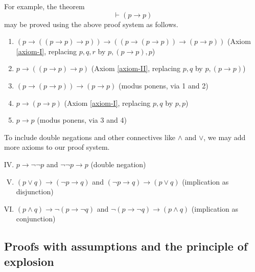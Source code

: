 For example, the theorem
%
\[\vdash (p \rightarrow p)\]
%
may be proved using the above proof system as follows.
%
\begin{enumerate}
    \item \((p \rightarrow ((p \rightarrow p) \rightarrow p)) \rightarrow ((p \rightarrow (p \rightarrow p)) \rightarrow (p \rightarrow p))\)
    \hfill (Axiom \ref{axiom-I}, replacing \(p, q, r\) by \(p, (p \rightarrow p), p\))

    \item \(p \rightarrow ((p \rightarrow p) \rightarrow p)\)
    \hfill (Axiom \ref{axiom-II}, replacing \(p, q\) by \(p, (p \rightarrow p)\))

    \item \((p \rightarrow (p \rightarrow p)) \rightarrow (p \rightarrow p)\)
    \hfill (modus ponens, via 1 and 2)

    \item \(p \rightarrow (p \rightarrow p)\)
    \hfill (Axiom \ref{axiom-I}, replacing \(p, q\) by \(p, p\))

    \item \(p \rightarrow p\)
    \hfill (modus ponens, via 3 and 4)
\end{enumerate}



To include double negations and other connectives like \(\land\) and \(\lor\), we may add more axioms to our proof system.
%
\begin{enumerate}[I.]
    \setcounter{enumi}{3}
    \item \(p \rightarrow \neg\neg p\) and \(\neg\neg p \rightarrow p\)
    \hfill (double negation)
    \label{axiom-IV}
    
    \item \((p \lor q) \rightarrow (\neg p \rightarrow q)\) and \((\neg p \rightarrow q) \rightarrow (p \lor q)\)
    \hfill (implication as disjunction)
    \label{axiom-V}
    
    \item \((p \land q) \rightarrow \neg(p \rightarrow \neg q)\) and \(\neg(p \rightarrow \neg q) \rightarrow (p \land q)\)
    \hfill (implication as conjunction)
    \label{axiom-VI}
\end{enumerate}



\subsection{Proofs with assumptions and the principle of explosion}

